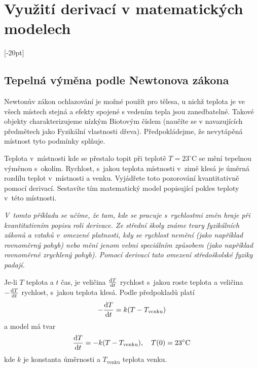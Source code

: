 \konec



\ifx\jenomslide\undefined\else\def\jenomslide##1\konec{}\fi

\stranka
\section{Využití derivací v matematických modelech}




\stranka

[-20pt]
\subsection{Tepelná výměna podle Newtonova zákona}  Newtonův zákon ochlazování je možné použít pro tělesa, u nichž teplota je ve všech místech stejná a efekty spojené s vedením tepla jsou zanedbatelné. Takové objekty charakterizujeme nízkým Biotovým číslem (naučíte se v navazujících předmětech jako Fyzikální vlastnosti dřeva). Předpokládejme, že nevytápěná místnost tyto podmínky splňuje.

Teplota v místnosti kde se přestalo topit při teplotě
$T=23^\circ\mathrm{C}$ se mění tepelnou výměnou s okolím. Rychlost,
s jakou teplota místnosti v zimě klesá je úměrná rozdílu teplot
v místnosti a venku. Vyjádřete toto pozorování kvantitativně pomocí
derivací. Sestavíte tím matematický model popisující pokles teploty
v této místnosti.

\textit{V tomto příkladu se učíme, že tam, kde se pracuje s rychlostmi změn hraje při kvantitativním popisu roli derivace. Ze střední školy známe tvary fyzikálních zákonů a vztahů v omezené platnosti, kdy se rychlost nemění (jako například  rovnoměrný pohyb) nebo mění jenom velmi speciálním způsobem (jako například  rovnoměrně zrychlený pohyb). Pomocí derivací tato omezení středoškolské fyziky padají. }

\reseni
Je-li $T$ teplota a $t$ čas, je veličina $ \frac{\mathrm{d}T}{\mathrm{d}t}$ rychlost s jakou roste teplota a veličina $-\frac{\mathrm{d}T}{\mathrm{d}t}$ rychlost, s jakou teplota klesá. Podle předpokladů platí
\begin{equation*}
  -\frac{\mathrm{d}T}{\mathrm{d}t}=k(T-T_{\text{venku}})
\end{equation*}
a model má tvar
\begin{equation*}
  \frac{\mathrm{d}T}{\mathrm{d}t}=-k(T-T_{\text{venku}}),\quad T(0)=23^\circ\mathrm{C}
\end{equation*}
kde $k$ je konstanta úměrnosti a $T_{\text{venku}}$ teplota venku.


